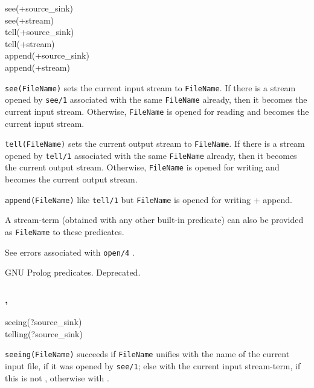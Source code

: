 \begin{TemplatesOneCol}
see(+source\_sink)\\
see(+stream)\\
tell(+source\_sink)\\
tell(+stream)\\
append(+source\_sink)\\
append(+stream)

\end{TemplatesOneCol}

\Description

\texttt{see(FileName)} sets the current input stream to \texttt{FileName}.
If there is a stream opened by \texttt{see/1} associated with the same
\texttt{FileName} already, then it becomes the current input stream.
Otherwise, \texttt{FileName} is opened for reading and becomes the current
input stream.

\texttt{tell(FileName)} sets the current output stream to \texttt{FileName}.
If there is a stream opened by \texttt{tell/1} associated with the same
\texttt{FileName} already, then it becomes the current output stream.
Otherwise, \texttt{FileName} is opened for writing and becomes the current
output stream.

\texttt{append(FileName)} like \texttt{tell/1} but
\texttt{FileName} is opened for writing + append.

A stream-term (obtained with any other built-in predicate) can also be
provided as \texttt{FileName} to these predicates.

\Errors

See errors associated with \texttt{open/4} .

\Portability

GNU Prolog predicates. Deprecated.

\subsubsection{,
               }

\begin{TemplatesOneCol}
seeing(?source\_sink)\\
telling(?source\_sink)

\end{TemplatesOneCol}

\Description

\texttt{seeing(FileName)} succeeds if \texttt{FileName} unifies
with the name of the current input file, if it was opened by
\texttt{see/1}; else with the current input stream-term, if this is not
, otherwise with
.

